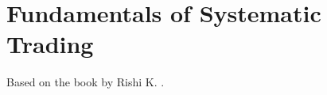\section{Fundamentals of Systematic Trading}

Based on the book by Rishi K. \cite{rishi_2013}.



\newpage



\newpage



\newpage



\newpage



\newpage



\newpage



\newpage



\newpage



\newpage



